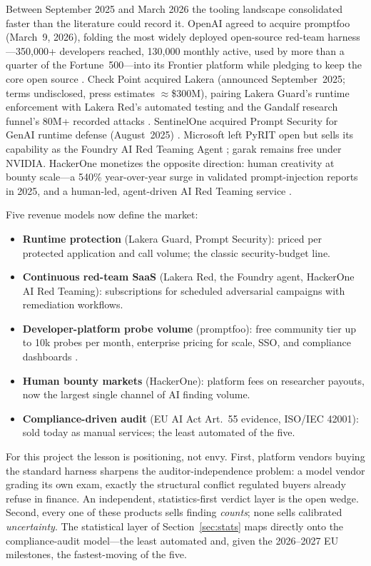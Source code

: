 Between September 2025 and March 2026 the tooling landscape consolidated
faster than the literature could record it. OpenAI agreed to acquire
promptfoo (March~9, 2026), folding the most widely deployed open-source
red-team harness---350{,}000+ developers reached, 130{,}000 monthly
active, used by more than a quarter of the Fortune~500---into its
Frontier platform while pledging to keep the core open source
\cite{promptfoo-openai}. Check Point acquired Lakera (announced
September~2025; terms undisclosed, press estimates $\approx$\$300M),
pairing Lakera Guard's runtime enforcement with Lakera Red's automated
testing and the Gandalf research funnel's 80M+ recorded attacks
\cite{checkpoint-lakera,lakera-ctech}. SentinelOne acquired Prompt
Security for GenAI runtime defense (August~2025)
\cite{sentinelone-promptsec}. Microsoft left PyRIT open but sells its
capability as the Foundry AI Red Teaming Agent \cite{foundry-rt}; garak
remains free under NVIDIA. HackerOne monetizes the opposite direction:
human creativity at bounty scale---a 540\% year-over-year surge in
validated prompt-injection reports in 2025, and a human-led,
agent-driven AI Red Teaming service \cite{hackerone-hpsr,hackerone-ai-rt}.

Five revenue models now define the market:
\begin{itemize}
  \item \textbf{Runtime protection} (Lakera Guard, Prompt Security):
  priced per protected application and call volume; the classic
  security-budget line.
  \item \textbf{Continuous red-team SaaS} (Lakera Red, the Foundry
  agent, HackerOne AI Red Teaming): subscriptions for scheduled
  adversarial campaigns with remediation workflows.
  \item \textbf{Developer-platform probe volume} (promptfoo): free
  community tier up to 10k probes per month, enterprise pricing for
  scale, SSO, and compliance dashboards \cite{promptfoo-pricing}.
  \item \textbf{Human bounty markets} (HackerOne): platform fees on
  researcher payouts, now the largest single channel of AI finding
  volume.
  \item \textbf{Compliance-driven audit} (EU AI Act Art.~55 evidence,
  ISO/IEC 42001): sold today as manual services; the least automated
  of the five.
\end{itemize}

For this project the lesson is positioning, not envy. First, platform
vendors buying the standard harness sharpens the auditor-independence
problem: a model vendor grading its own exam, exactly the structural
conflict regulated buyers already refuse in finance. An independent,
statistics-first verdict layer is the open wedge. Second, every one of
these products sells finding \emph{counts}; none sells calibrated
\emph{uncertainty}. The statistical layer of Section~\ref{sec:stats}
maps directly onto the compliance-audit model---the least automated and,
given the 2026--2027 EU milestones, the fastest-moving of the five.

